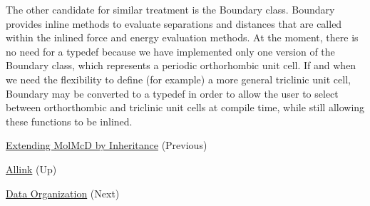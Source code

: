 \-The other candidate for similar treatment is the \-Boundary class. \-Boundary provides inline methods to evaluate separations and distances that are called within the inlined force and energy evaluation methods. \-At the moment, there is no need for a typedef because we have implemented only one version of the \-Boundary class, which represents a periodic orthorhombic unit cell. \-If and when we need the flexibility to define (for example) a more general triclinic unit cell, \-Boundary may be converted to a typedef in order to allow the user to select between orthorthombic and triclinic unit cells at compile time, while still allowing these functions to be inlined. 
\begin{DoxyItemize}
\item \hyperlink{extension_page}{\-Extending \-Mol\-Mc\-D by \-Inheritance} (\-Previous)  
\item \hyperlink{index}{\-Allink} (\-Up)  
\item \hyperlink{data_page}{\-Data \-Organization} (\-Next)  
\end{DoxyItemize}